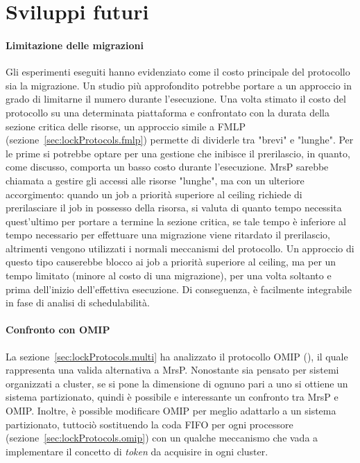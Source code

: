 \section{Sviluppi futuri}
\label{sec:open_problem}

\paragraph{Limitazione delle migrazioni}

Gli esperimenti eseguiti hanno evidenziato come il costo principale del protocollo sia la migrazione. Un studio più approfondito potrebbe portare a un approccio in grado di limitarne il numero durante l'esecuzione. Una volta stimato il costo del protocollo su una determinata piattaforma e confrontato con la durata della sezione critica delle risorse, un approccio simile a FMLP (sezione~\ref{sec:lockProtocols.fmlp}) permette di dividerle tra "brevi" e "lunghe". Per le prime si potrebbe optare per una gestione che inibisce il prerilascio, in quanto, come discusso, comporta un basso costo durante l'esecuzione. MrsP sarebbe chiamata a gestire gli accessi alle risorse "lunghe", ma con un ulteriore accorgimento: quando un job a priorità superiore al ceiling richiede di prerilasciare il job in possesso della risorsa, si valuta di quanto tempo necessita quest'ultimo per portare a termine la sezione critica, se tale tempo è inferiore al tempo necessario per effettuare una migrazione viene ritardato il prerilascio, altrimenti vengono utilizzati i normali meccanismi del protocollo. Un approccio di questo tipo causerebbe blocco ai job a priorità superiore al ceiling, ma per un tempo limitato (minore al costo di una migrazione), per una volta soltanto e prima dell'inizio dell'effettiva esecuzione. Di conseguenza, è facilmente integrabile in fase di analisi di schedulabilità.

\paragraph{Confronto con OMIP}

La sezione~\ref{sec:lockProtocols.multi} ha analizzato il protocollo OMIP (\cite{6602109}), il quale rappresenta una valida alternativa a MrsP. Nonostante sia pensato per sistemi organizzati a cluster, se si pone la dimensione di ognuno pari a uno si ottiene un sistema partizionato, quindi è possibile e interessante un confronto tra MrsP e OMIP. Inoltre, è possible modificare OMIP per meglio adattarlo a un sistema partizionato, tuttociò sostituendo la coda FIFO per ogni processore (sezione~\ref{sec:lockProtocols.omip}) con un qualche meccanismo che vada a implementare il concetto di \textit{token} da acquisire in ogni cluster.


